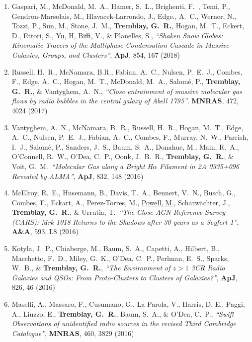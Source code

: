 \documentclass[11pt]{article}
\begin{document}
\begin{enumerate}[resume]
\item Gaspari, M., McDonald, M.~A.,
Hamer, S.~L., Brighenti, F.~, Temi, P., Gendron-Marsolais, M., Hlavacek-Larrondo, J., Edge., A.~C.,
Werner, N., Tozzi, P., Sun, M.,
Stone, J.~M., \textbf{Tremblay, G.~R.}, Hogan, M.~T., Eckert, D.,
Ettori, S., Yu, H, Biffi, V.,
\& Planelles, S., \textit{``Shaken Snow Globes: Kinematic Tracers of the Multiphase Condensation
 Cascade in Massive Galaxies, Groups, and Clusters''}, \textbf{ApJ}, 854, 167 (2018)

\item Russell, H.~R., McNamara, B.R., Fabian, A.~C., Nulsen, P.~E.~J., Combes, F., Edge, A.~C., Hogan, M.~T., McDonald, M.~A., Salom\'{e}, P.,
\textbf{Tremblay, G.~R.}, \& Vantyghem, A.~N., \textit{``Close entrainment of massive molecular gas flows by radio bubbles in the central galaxy of Abell 1795''}. \textbf{MNRAS}, 472, 4024 (2017)


\item Vantyghem, A.~N., McNamara, B.~R.,
Russell, H.~R., Hogan, M.~T., Edge, A.~C.,
Nulsen, P.~E.~J., Fabian, A.~C., Combes, F.,
Murray, N.~W., Parrish, I.~J., Salom\'{e}, P.,
Sanders, J.~S., Baum, S.~A., Donahue, M.,
Main, R.~A., O'Connell, R.~W., O'Dea, C.~P.,
Oonk, J.~B.~R., \textbf{Tremblay, G.~R.}, \& Voit, G.~M.\ \textit{``Molecular Gas along a Bright H$\alpha$ Filament in 2A 0335+096 Revealed by ALMA''}, \textbf{ApJ}, 832, 148 (2016)

\item McElroy, R.~E., Husemann, B.,
Davis, T.~A., Bennert, V.~N., Busch, G.,
Combes, F., Eckart, A., Perez-Torres,
M., \uline{Powell, M.}, Scharw\"{a}chter, J., \textbf{Tremblay, G.~R.}, \& Urrutia, T.\ \textit{``The Close AGN Reference Survey (CARS): Mrk 1018 Returns to the Shadows after 30 years as a Seyfert 1''}, \textbf{A\&A}, 593, L8 (2016)


\item Kotyla, J.~P., Chiaberge, M., Baum, S.~A., Capetti, A., Hilbert, B., Macchetto, F.~D., Miley, G.~K., O'Dea, C.~P., Perlman, E.~S., Sparks, W.~B., \& \textbf{Tremblay, G.~R.}, \textit{``The Environment of $z>1$ 3CR Radio Galaxies and QSOs: From Proto-Clusters to Clusters of Galaxies?''}, \textbf{ApJ}, 826, 46 (2016)


\item Maselli, A., Massaro, F., Cusumano, G., La Parola, V., Harris, D. E., Paggi, A., Liuzzo, E., \textbf{Tremblay, G.~R.},
Baum, S.~A., \& O'Dea, C.~P., \textit{``Swift Observations of unidentified radio sources in the revised Third Cambridge Catalogue''}, \textbf{MNRAS}, 460, 3829 (2016)


\end{enumerate}
\end{document}
